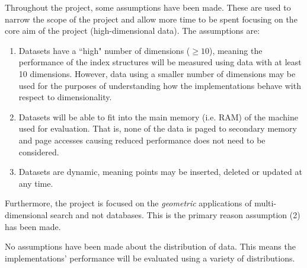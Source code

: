 Throughout the project, some assumptions have been made. These are used to narrow the scope of the project and allow more time to be spent focusing on the core aim of the project (high-dimensional data). The assumptions are:
\begin{enumerate}
	\item Datasets have a ``high" number of dimensions ($\geq 10$), meaning the performance of the index structures will be measured using data with at least 10 dimensions. However, data using a smaller number of dimensions may be used for the purposes of understanding how the implementations behave with respect to dimensionality.
	\item Datasets will be able to fit into the main memory (i.e. RAM) of the machine used for evaluation. That is, none of the data is paged to secondary memory and page accesses causing reduced performance does not need to be considered.
	\item Datasets are dynamic, meaning points may be inserted, deleted or updated at any time.
\end{enumerate}
Furthermore, the project is focused on the \textit{geometric} applications of multi-dimensional search and not databases. This is the primary reason assumption (2) has been made.

No assumptions have been made about the distribution of data. This means the implementations' performance will be evaluated using a variety of distributions.
